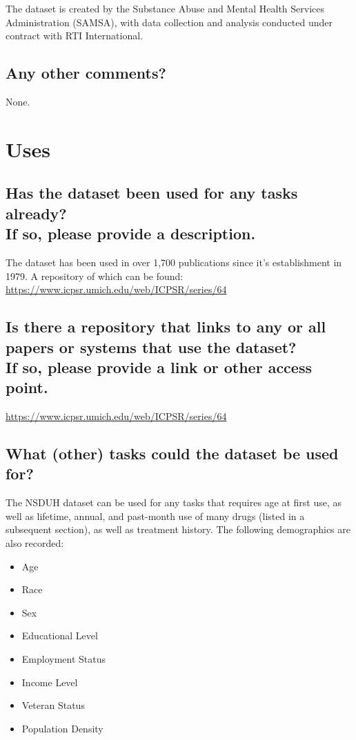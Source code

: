 \documentclass[letterpaper, 10 pt, conference]{ieeeconf}  %
\newcommand{\subtitle}[1]{{\\ \small \normalfont \color{purple} #1}}
\begin{document}
The dataset is created by the Substance Abuse and Mental Health Services Administration (SAMSA), with data collection and analysis conducted under contract with RTI International.

\subsection{Any other comments?}

None.

\section{Uses}

\subsection{Has the dataset been used for any tasks already? \subtitle{If so, please provide a description.}}

The dataset has been used in over 1,700 publications since it's establishment in 1979. A repository of which can be found: \\

\href{https://www.icpsr.umich.edu/web/ICPSR/series/64}{https://www.icpsr.umich.edu/web/ICPSR/series/64}

\subsection{Is there a repository that links to any or all papers or systems that use the dataset? \subtitle{If so, please provide a link or other access point. }}

\href{https://www.icpsr.umich.edu/web/ICPSR/series/64}{https://www.icpsr.umich.edu/web/ICPSR/series/64}


\subsection{What (other) tasks could the dataset be used for?}

The NSDUH dataset can be used for any tasks that requires age at first use, as well as lifetime, annual, and past-month use of many drugs (listed in a subsequent section), as well as treatment history. The following demographics are also recorded:

\begin{itemize}
    \item Age
    \item Race
    \item Sex
    \item Educational Level
    \item Employment Status
    \item Income Level
    \item Veteran Status
    \item Population Density
\end{itemize}
\end{document}
